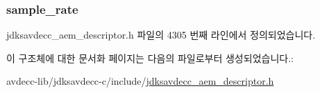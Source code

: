 \subsubsection[{\texorpdfstring{sample\+\_\+rate}{sample_rate}}]{ sample\+\_\+rate}\hypertarget{structjdksavdecc__values__sample__rate_a2fba55d9442e7dba4623825cd737e520}{}\label{structjdksavdecc__values__sample__rate_a2fba55d9442e7dba4623825cd737e520}


jdksavdecc\+\_\+aem\+\_\+descriptor.\+h 파일의 4305 번째 라인에서 정의되었습니다.



이 구조체에 대한 문서화 페이지는 다음의 파일로부터 생성되었습니다.\+:\begin{DoxyCompactItemize}
\item 
avdecc-\/lib/jdksavdecc-\/c/include/\hyperlink{jdksavdecc__aem__descriptor_8h}{jdksavdecc\+\_\+aem\+\_\+descriptor.\+h}\end{DoxyCompactItemize}
